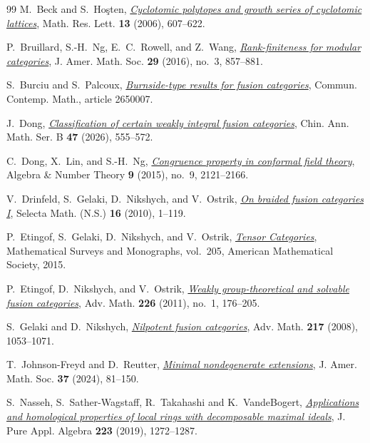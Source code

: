 \documentclass[11pt,a4paper]{article}
\numberwithin{equation}{section}
\begin{document}
\begin{thebibliography}{99}
\small
{}
M.~Beck and S.~Ho\c{s}ten, \href{https://doi.org/10.4310/mrl.2006.v13.n4.a10}{\emph{Cyclotomic polytopes and growth series of cyclotomic lattices}}, Math. Res. Lett. \textbf{13} (2006), 607--622.

P.~Bruillard, S.-H.~Ng, E.~C.~Rowell, and Z.~Wang,
\href{https://doi.org/10.1090/jams/842}{\emph{Rank-finiteness for modular categories}},
J. Amer. Math. Soc. \textbf{29} (2016), no.~3, 857--881.

S.~Burciu and S.~Palcoux,
\href{https://doi.org/10.1142/S0219199726500070}{\emph{Burnside-type results for fusion categories}},
Commun. Contemp. Math., article 2650007.

J.~Dong,
\href{https://doi.org/10.1007/s11401-026-0019-6}{\emph{Classification of certain weakly integral fusion categories}},
Chin. Ann. Math. Ser. B \textbf{47} (2026), 555--572.

C.~Dong, X.~Lin, and S.-H.~Ng,
\href{https://doi.org/10.2140/ant.2015.9.2121}{\emph{Congruence property in conformal field theory}},
Algebra \& Number Theory \textbf{9} (2015), no.~9, 2121--2166.

V.~Drinfeld, S.~Gelaki, D.~Nikshych, and V.~Ostrik,
\href{https://doi.org/10.1007/s00029-010-0017-z}{\emph{On braided fusion categories I}},
Selecta Math. (N.S.) \textbf{16} (2010), 1--119.

P.~Etingof, S.~Gelaki, D.~Nikshych, and V.~Ostrik,
\href{https://math.mit.edu/~etingof/egnobookfinal.pdf}{\emph{Tensor Categories}},
Mathematical Surveys and Monographs, vol.~205,
American Mathematical Society, 2015.

P.~Etingof, D.~Nikshych, and V.~Ostrik,
\href{https://doi.org/10.1016/j.aim.2010.06.009}{\emph{Weakly group-theoretical and solvable fusion categories}},
Adv. Math. \textbf{226} (2011), no.~1, 176--205.

S.~Gelaki and D.~Nikshych, \href{https://doi.org/10.1016/j.aim.2007.08.001}{\emph{Nilpotent fusion categories}}, Adv. Math. \textbf{217} (2008), 1053--1071.

T.~Johnson-Freyd and D.~Reutter,
\href{https://doi.org/10.1090/jams/1023}{\emph{Minimal nondegenerate extensions}},
J. Amer. Math. Soc. \textbf{37} (2024), 81--150.

S.~Nasseh, S.~Sather-Wagstaff, R.~Takahashi and K.~VandeBogert,
\href{https://doi.org/10.1016/j.jpaa.2018.06.006}{\emph{Applications and homological properties of local rings with
decomposable maximal ideals}}, J. Pure Appl. Algebra \textbf{223}
(2019), 1272--1287.


\end{thebibliography}
\end{document}
